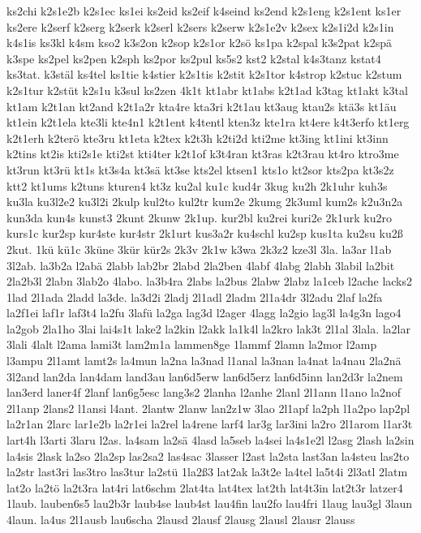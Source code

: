{ks2chi
k2s1e2b
k2s1ec
ks1ei
ks2eid
ks2eif
k4seind
ks2end
k2s1eng
k2s1ent
ks1er
ks2ere
k2serf
k2serg
k2serk
k2serl
k2sers
k2serw
k2s1e2v
k2sex
k2s1i2d
k2s1in
k4s1is
ks3kl
k4sm
kso2
k3s2on
k2sop
k2s1or
k2sö
ks1pa
k2spal
k3s2pat
k2spä
k3spe
ks2pel
ks2pen
k2sph
ks2por
ks2pul
ks5s2
kst2
k2stal
k4s3tanz
kstat4
ks3tat.
k3stäl
ks4tel
ks1tie
k4stier
k2s1tis
k2stit
k2s1tor
k4strop
k2stuc
k2stum
k2s1tur
k2stüt
k2s1u
k3sul
ks2zen
4k1t
kt1abr
kt1abs
k2t1ad
k3tag
kt1akt
k3tal
kt1am
k2t1an
kt2and
k2t1a2r
kta4re
kta3ri
k2t1au
kt3aug
ktau2s
ktä3s
kt1äu
kt1ein
k2t1ela
kte3li
kte4n1
k2t1ent
k4tentl
kten3z
kte1ra
kt4ere
k4t3erfo
kt1erg
k2t1erh
k2terö
kte3ru
kt1eta
k2tex
k2t3h
k2ti2d
kti2me
kt3ing
kt1ini
kt3inn
k2tins
kt2is
kti2s1e
kti2st
kti4ter
k2t1of
k3t4ran
kt3ras
k2t3rau
kt4ro
ktro3me
kt3run
kt3rü
kt1s
kt3s4a
kt3sä
kt3se
kts2el
ktsen1
kts1o
kt2sor
kts2pa
kt3s2z
ktt2
kt1ums
k2tuns
kturen4
kt3z
ku2al
ku1c
kud4r
3kug
ku2h
2k1uhr
kuh3s
ku3la
ku3l2e2
ku3l2i
2kulp
kul2to
kul2tr
kum2e
2kumg
2k3uml
kum2s
k2u3n2a
kun3da
kun4s
kunst3
2kunt
2kunw
2k1up.
kur2bl
ku2rei
kuri2e
2k1urk
ku2ro
kurs1c
kur2sp
kur4ste
kur4str
2k1urt
kus3a2r
ku4schl
ku2sp
kus1ta
ku2su
ku2ß
2kut.
1kü
kü1c
3küne
3kür
kür2s
2k3v
2k1w
k3wa
2k3z2
kze3l
3la.
la3ar
l1ab
3l2ab.
la3b2a
l2abä
2labb
lab2br
2labd
2la2ben
4labf
4labg
2labh
3labil
la2bit
2la2b3l
2labn
3lab2o
4labo.
la3b4ra
2labs
la2bus
2labw
2labz
la1ceb
l2ache
lacks2
1lad
2l1ada
2ladd
la3de.
la3d2i
2ladj
2l1adl
2ladm
2l1a4dr
3l2adu
2laf
la2fa
la2f1ei
laf1r
laf3t4
la2fu
3lafü
la2ga
lag3d
l2ager
4lagg
la2gio
lag3l
la4g3n
lago4
la2gob
2la1ho
3lai
lai4s1t
lake2
la2kin
l2akk
la1k4l
la2kro
lak3t
2l1al
3lala.
la2lar
3lali
4lalt
l2ama
lami3t
lam2m1a
lammen8ge
1lammf
2lamn
la2mor
l2amp
l3ampu
2l1amt
lamt2s
la4mun
la2na
la3nad
l1anal
la3nan
la4nat
la4nau
2la2nä
3l2and
lan2da
lan4dam
land3au
lan6d5erw
lan6d5erz
lan6d5inn
lan2d3r
la2nem
lan3erd
laner4f
2lanf
lan6g5esc
lang3s2
2lanha
l2anhe
2lanl
2l1ann
l1ano
la2nof
2l1anp
2lans2
l1ansi
l4ant.
2lantw
2lanw
lan2z1w
3lao
2l1apf
la2ph
l1a2po
lap2pl
la2r1an
2larc
lar1e2b
la2r1ei
la2rel
la4rene
larf4
lar3g
lar3ini
la2ro
2l1arom
l1ar3t
lart4h
l3arti
3laru
l2as.
la4sam
la2sä
4lasd
la5seb
la4sei
la4s1e2l
l2asg
2lash
la2sin
la4sis
2lask
la2so
2la2sp
las2sa2
las4sac
3lasser
l2ast
la2sta
last3an
la4steu
las2to
la2str
last3ri
las3tro
las3tur
la2stü
1la2ß3
lat2ak
la3t2e
la4tel
la5t4i
2l3atl
2latm
lat2o
la2tö
la2t3ra
lat4ri
lat6schm
2lat4ta
lat4tex
lat2th
lat4t3in
lat2t3r
latzer4
1laub.
lauben6s5
lau2b3r
laub4se
laub4st
lau4fin
lau2fo
lau4fri
1laug
lau3gl
3laun
4laun.
la4us
2l1ausb
lau6scha
2lausd
2lausf
2lausg
2lausl
2lausr
2lauss
}
